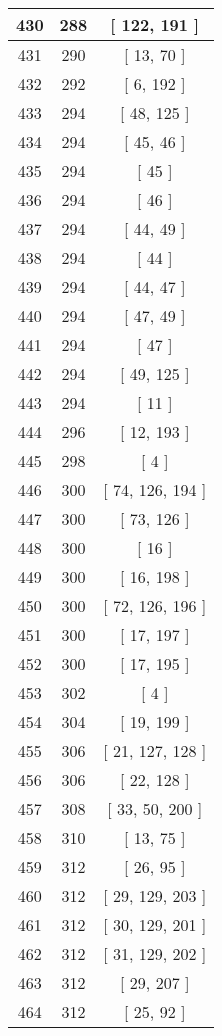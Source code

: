 \begin{center}
\begin{longtable}[H]{|| c c c ||}
\hline
430 & 288 & [ 122, 191 ] \\ 
\hline
431 & 290 & [ 13, 70 ] \\ 
\hline
432 & 292 & [ 6, 192 ] \\ 
\hline
433 & 294 & [ 48, 125 ] \\ 
\hline
434 & 294 & [ 45, 46 ] \\ 
\hline
435 & 294 & [ 45 ] \\ 
\hline
436 & 294 & [ 46 ] \\ 
\hline
437 & 294 & [ 44, 49 ] \\ 
\hline
438 & 294 & [ 44 ] \\ 
\hline
439 & 294 & [ 44, 47 ] \\ 
\hline
440 & 294 & [ 47, 49 ] \\ 
\hline
441 & 294 & [ 47 ] \\ 
\hline
442 & 294 & [ 49, 125 ] \\ 
\hline
443 & 294 & [ 11 ] \\ 
\hline
444 & 296 & [ 12, 193 ] \\ 
\hline
445 & 298 & [ 4 ] \\ 
\hline
446 & 300 & [ 74, 126, 194 ] \\ 
\hline
447 & 300 & [ 73, 126 ] \\ 
\hline
448 & 300 & [ 16 ] \\ 
\hline
449 & 300 & [ 16, 198 ] \\ 
\hline
450 & 300 & [ 72, 126, 196 ] \\ 
\hline
451 & 300 & [ 17, 197 ] \\ 
\hline
452 & 300 & [ 17, 195 ] \\ 
\hline
453 & 302 & [ 4 ] \\ 
\hline
454 & 304 & [ 19, 199 ] \\ 
\hline
455 & 306 & [ 21, 127, 128 ] \\ 
\hline
456 & 306 & [ 22, 128 ] \\ 
\hline
457 & 308 & [ 33, 50, 200 ] \\ 
\hline
458 & 310 & [ 13, 75 ] \\ 
\hline
459 & 312 & [ 26, 95 ] \\ 
\hline
460 & 312 & [ 29, 129, 203 ] \\ 
\hline
461 & 312 & [ 30, 129, 201 ] \\ 
\hline
462 & 312 & [ 31, 129, 202 ] \\ 
\hline
463 & 312 & [ 29, 207 ] \\ 
\hline
464 & 312 & [ 25, 92 ] \\ 

\end{longtable}
\end{center}
